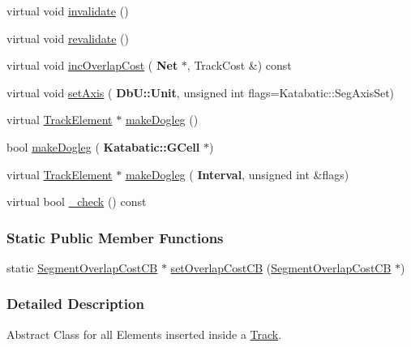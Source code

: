 \begin{DoxyCompactItemize}
virtual void \mbox{\hyperlink{classKite_1_1TrackElement_a893f1101c650c08c98612515c2b1a89c}{invalidate}} ()
\item 
virtual void \mbox{\hyperlink{classKite_1_1TrackElement_a5bd93abe1416952ace15a98dbeeed124}{revalidate}} ()
\item 
virtual void \mbox{\hyperlink{classKite_1_1TrackElement_a7f1126d43df68dd4edbb8d047a134edb}{inc\+Overlap\+Cost}} (\textbf{ Net} $\ast$, Track\+Cost \&) const
\item 
virtual void \mbox{\hyperlink{classKite_1_1TrackElement_a45e685b1e3ee630d24bf43746553af4c}{set\+Axis}} (\textbf{ Db\+U\+::\+Unit}, unsigned int flags=Katabatic\+::\+Seg\+Axis\+Set)
\item 
virtual \mbox{\hyperlink{classKite_1_1TrackElement}{Track\+Element}} $\ast$ \mbox{\hyperlink{classKite_1_1TrackElement_a7a9637875364e84e6862de0102341715}{make\+Dogleg}} ()
\item 
bool \mbox{\hyperlink{classKite_1_1TrackElement_a3e1b4982a2427f74e55592520ab6272d}{make\+Dogleg}} (\textbf{ Katabatic\+::\+G\+Cell} $\ast$)
\item 
virtual \mbox{\hyperlink{classKite_1_1TrackElement}{Track\+Element}} $\ast$ \mbox{\hyperlink{classKite_1_1TrackElement_a524f1569b2f2c1a84df2fe47e84e28ed}{make\+Dogleg}} (\textbf{ Interval}, unsigned int \&flags)
\item 
virtual bool \mbox{\hyperlink{classKite_1_1TrackElement_ad79f4c6ea0fe1135b8264a29af085909}{\+\_\+check}} () const
\end{DoxyCompactItemize}
\subsubsection*{Static Public Member Functions}
\begin{DoxyCompactItemize}
\item 
static \mbox{\hyperlink{namespaceKite_ac86883c8d5a0f34ab9b4ec6eaaad6c9f}{Segment\+Overlap\+Cost\+CB}} $\ast$ \mbox{\hyperlink{classKite_1_1TrackElement_a4648fa47d0870cf743436ff6a6239fd9}{set\+Overlap\+Cost\+CB}} (\mbox{\hyperlink{namespaceKite_ac86883c8d5a0f34ab9b4ec6eaaad6c9f}{Segment\+Overlap\+Cost\+CB}} $\ast$)
\end{DoxyCompactItemize}


\subsubsection{Detailed Description}
Abstract Class for all Elements inserted inside a \mbox{\hyperlink{classKite_1_1Track}{Track}}. 

